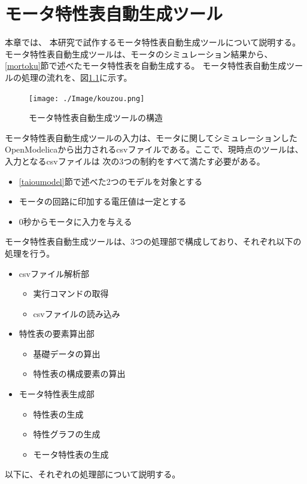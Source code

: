 \chapter{モータ特性表自動生成ツール}\label{cha:Tool}
本章では、 本研究で試作するモータ特性表自動生成ツールについて説明する。
モータ特性表自動生成ツールは、モータのシミュレーション結果から、\ref{mortoku}節で述べたモータ特性表を自動生成する。
モータ特性表自動生成ツールの処理の流れを、図\ref{fig:kouzou}に示す。
\begin{figure}[t]
	\centering
	\texttt{[image: ./Image/kouzou.png]}
    \caption{モータ特性表自動生成ツールの構造}
	\label{fig:kouzou}
  \end{figure}
モータ特性表自動生成ツールの入力は、モータに関してシミュレーションしたOpenModelicaから出力されるcsvファイルである。ここで、現時点のツールは、入力となるcsvファイルは
次の3つの制約をすべて満たす必要がある。
\begin{itemize}
    \item \ref{taioumodel}節で述べた2つのモデルを対象とする
    \item モータの回路に印加する電圧値は一定とする
    \item 0秒からモータに入力を与える
\end{itemize}


モータ特性表自動生成ツールは、3つの処理部で構成しており、それぞれ以下の処理を行う。
\begin{itemize}
    \item csvファイル解析部
    \begin{itemize}
        \item 実行コマンドの取得
        \item csvファイルの読み込み
    \end{itemize}
    \item 特性表の要素算出部
    \begin{itemize}
        \item 基礎データの算出
        \item 特性表の構成要素の算出
    \end{itemize}
    \item モータ特性表生成部
    \begin{itemize}
        \item 特性表の生成
        \item 特性グラフの生成
        \item モータ特性表の生成
    \end{itemize}
\end{itemize}
以下に、それぞれの処理部について説明する。
